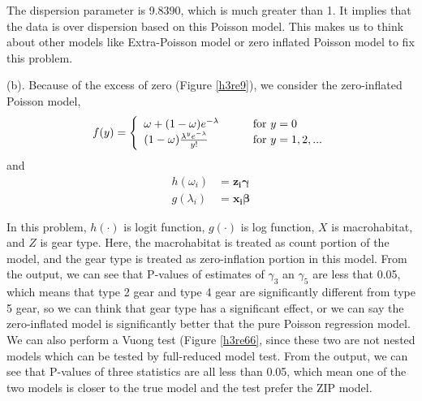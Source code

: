 \documentclass[letterpaper, 12pt]{article}
\newcommand{\ba}{$$\begin{aligned}}
\newcommand{\ea}{\end{aligned}$$}
\begin{document}
The dispersion parameter is 9.8390, which is much greater than 1. It implies that the data is over dispersion based on this Poisson model. This makes us to think about other models like Extra-Poisson model or zero inflated Poisson model to fix this problem.


(b). Because of the excess of zero (Figure \ref{h3re9}), we consider the zero-inflated Poisson model,
$$
f(y)=\left\{\begin{array}{l l}\omega+(1-\omega)e^{-\lambda}\qquad &\text{for }y=0\\
(1-\omega)\frac{\lambda^ye^{-\lambda}}{y!}\qquad &\text{for }y=1,2,...
\end{array}\right.
$$
and
\ba
h(\omega_i)&=\bm{z_i}\bm{\gamma}\\
g(\lambda_i)&=\bm{x_i}\bm{\beta}
\ea

In this problem, $h(\cdot)$ is logit function, $g(\cdot)$ is log function, $X$ is macrohabitat, and $Z$ is gear type. Here, the macrohabitat is treated as count portion of the model, and the gear type is treated as zero-inflation portion in this model. From the output, we can see that P-values of estimates of $\gamma_3$ an $\gamma_5$ are less that 0.05, which means that type 2 gear and type 4 gear are significantly different from type 5 gear, so we can think that gear type has a significant effect, or we can say the zero-inflated model is significantly better that the pure Poisson regression model. We can also perform a Vuong test (Figure \ref{h3re66}, since these two are not nested models which can be tested by full-reduced model test. From the output, we can see that P-values of three statistics are all less than 0.05, which mean one of the two models is closer to the true model and the test prefer the ZIP model.












\end{document}
